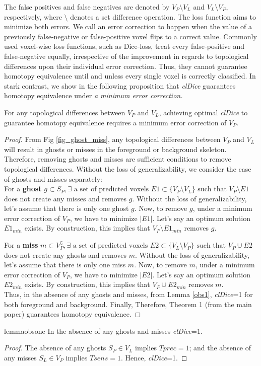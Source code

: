 The false positives and false negatives are denoted by $V_P\setminus V_L$ and $V_L\setminus V_P$, respectively, where $\setminus$ denotes a set difference operation. The loss function aims to minimize both errors. We call an error correction to happen when the value of a previously false-negative or false-positive voxel flips to a correct value. Commonly used voxel-wise loss functions, such as Dice-loss, treat every false-positive and false-negative equally, irrespective of the improvement in regards to topological differences upon their individual error correction. Thus, they cannot guarantee homotopy equivalence until and unless every single voxel is correctly classified. In stark contrast, we show in the following proposition that \textit{clDice} guarantees homotopy equivalence under \textit{a minimum error correction.}


\begin{proposition}

For any topological differences between $V_P$ and $V_L$, achieving optimal \textit{clDice} to guarantee homotopy equivalence requires a minimum error correction of $V_P$.
\end{proposition}

\begin{proof}
From Fig \ref{fig_ghost_miss}, any topological differences between $V_P$ and $V_L$ will result in ghosts or misses in the foreground or background skeleton. Therefore, removing ghosts and misses are sufficient conditions to remove topological differences. Without the loss of generalizability, we consider the case of ghosts and misses separately:\\

For a \textbf{ghost} $g \subset S_P, \exists \mbox{ a set of predicted voxels } E1 \subset \{V_P \setminus V_L\}\mbox{ such that } V_P \setminus E
1$ does not create any misses and removes $g$. Without the loss of generalizability, let's assume that there is only one ghost $g$. Now, to remove $g$, under a minimum error correction of $V_P$, we have to minimize $|E1|$. Let's say an optimum solution $E1_{min}$ exists. By construction, this implies that $V_P\setminus E1_{min}$ removes $g$.


For a \textbf{miss} $m \subset V_P^\complement, \exists \mbox{ a set of predicted voxels } E2 \subset \{V_L \setminus V_P\}\mbox{ such that } V_P \cup E2$ does not create any ghosts and removes $m$. Without the loss of generalizability, let's assume that there is only one miss $m$. Now, to remove $m$, under a minimum error correction of $V_P$, we have to minimize $|E2|$. Let's say an optimum solution $E2_{min}$ exists. By construction, this implies that $V_P\cup E2_{min}$ removes $m$.\\

Thus, in the absence of any ghosts and misses, from Lemma \ref{obs1}, \textit{clDice}=1 for both foreground and background. Finally, Therefore, Theorem 1 (from the main paper) guarantees homotopy equivalence.
\end{proof}


\begin{restatable}[]{lemma}{obsone}
\label{obs1}
In the absence of any ghosts and misses \textit{clDice}=1.
\end{restatable}

\begin{proof}
The absence of any ghosts $S_P \in V_L$ implies $Tprec=1$; and the absence of any misses $S_L \in V_P$ implies $Tsens=1$. Hence, \textit{clDice}=1.
\end{proof}